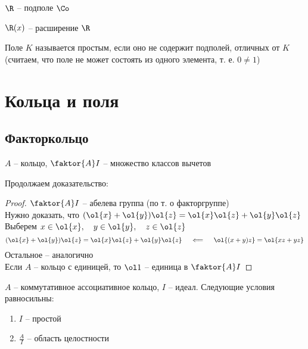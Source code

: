 \begin{exmpls}
	\item $ \R $ -- подполе $ \Co $
	\item $ \R(x) $ -- расширение $ \R $
\end{exmpls}

\begin{definition}
	Поле $ K $ называется простым, если оно не содержит подполей, отличных от $ K $ \\
	(считаем, что поле не может состоять из одного элемента, т. е. $ 0 \ne 1 $)
\end{definition}


\chapter{Кольца и поля}

\section{Факторкольцо}

\begin{remind}
	$ A $ -- кольцо, $ \faktor{A}I $ -- множество классов вычетов
\end{remind}

Продолжаем доказательство:

\begin{proof}
	$ \faktor{A}I $ -- абелева группа (по т. о факторгруппе) \\
	Нужно доказать, что $ (\ol{x} + \ol{y})\ol{z} = \ol{x}\ol{z} + \ol{y}\ol{z} $ \\
	Выберем $ x \in \ol{x}, \quad y \in \ol{y}, \quad z \in \ol{z} $
	$$ (\ol{x} + \ol{y})\ol{z} = \ol{x}\ol{z} + \ol{y}\ol{z} \quad \impliedby \quad \ol{(x + y)z} = \ol{xz + yz} $$
	Остальное -- аналогично \\
	Если $ A $ -- кольцо с единицей, то $ \ol1 $ -- единица в $ \faktor{A}I $
\end{proof}

\begin{theorem}
	$ A $ -- коммутативное ассоциативное кольцо, $ I $ -- идеал. Следующие условия равносильны:
	\begin{enumerate}
		\item\label{en:fak:1} $ I $ -- простой
		\item\label{en:fak:2} $ \frac{A}I $ -- область целостности
	\end{enumerate}
\end{theorem}

